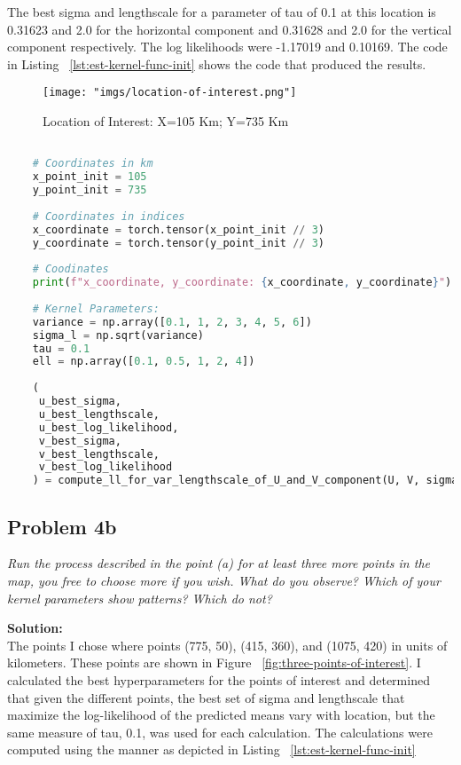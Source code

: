 \documentclass[11pt]{article}
\newcommand{\question}[1]{\textit{#1}}
\begin{document}
The best sigma and lengthscale for a parameter of tau of 0.1 at this location is 0.31623 and 2.0 for the horizontal component and 0.31628 and 2.0 for the vertical component respectively. The log likelihoods were -1.17019 and 0.10169. The code in Listing ~\ref{lst:est-kernel-func-init} shows the code that produced the results.

\begin{figure}[htbp]
    \centering
    \texttt{[image: "imgs/location-of-interest.png"]} %
    \caption{Location of Interest: X=105 Km; Y=735 Km}
    \label{fig:location-of-interest}
\end{figure}
\FloatBarrier

\begin{lstlisting}[language=Python, label=lst:est-kernel-func-init, caption={Estimating the kernel hyperparameters for the initial coordinate of 105 km, 735 km.}]

    # Coordinates in km
    x_point_init = 105
    y_point_init = 735
    
    # Coordinates in indices
    x_coordinate = torch.tensor(x_point_init // 3)
    y_coordinate = torch.tensor(y_point_init // 3)
    
    # Coodinates
    print(f"x_coordinate, y_coordinate: {x_coordinate, y_coordinate}")
    
    # Kernel Parameters:
    variance = np.array([0.1, 1, 2, 3, 4, 5, 6])
    sigma_l = np.sqrt(variance)
    tau = 0.1
    ell = np.array([0.1, 0.5, 1, 2, 4])
    
    (
     u_best_sigma, 
     u_best_lengthscale, 
     u_best_log_likelihood, 
     v_best_sigma, 
     v_best_lengthscale, 
     v_best_log_likelihood
    ) = compute_ll_for_var_lengthscale_of_U_and_V_component(U, V, sigma_l, ell, tau, x_coordinate, y_coordinate, verbose_tau=False)

\end{lstlisting}

\subsection{Problem 4b}

\question{Run the process described in the point (a) for at least three more points in the map, you free to choose more if you wish. What do you observe? Which of your kernel parameters show patterns? Which do not? 
}

\textbf{Solution:} \\
The points I chose where points (775, 50), (415, 360),  and (1075, 420) in units of kilometers. These points are shown in Figure ~\ref{fig:three-points-of-interest}. I calculated the best hyperparameters for the points of interest and determined that given the different points, the best set of sigma and lengthscale that maximize the log-likelihood of the predicted means vary with location, but the same measure of tau, 0.1, was used for each calculation. The calculations were computed using the manner as depicted in Listing ~\ref{lst:est-kernel-func-init}
\end{document}
